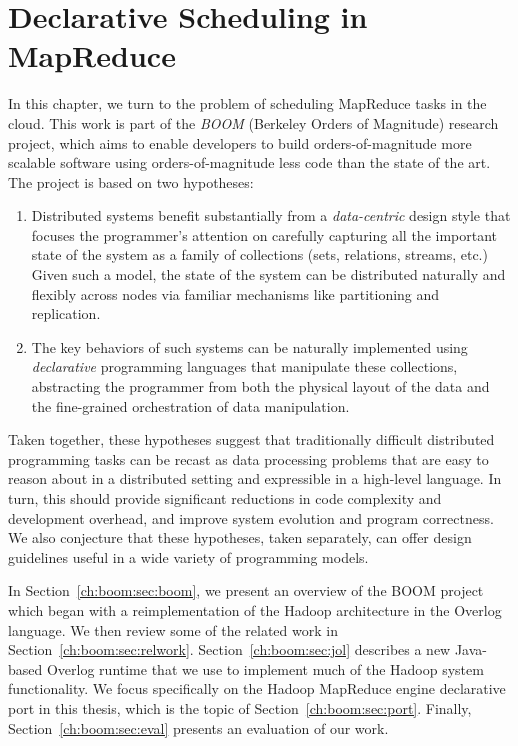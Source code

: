 \chapter[Declarative Scheduling in MapReduce]{Declarative Scheduling in MapReduce}
\label{ch:boom}

In this chapter, we turn to the problem of scheduling MapReduce tasks in the cloud. This work
is part of the \emph{BOOM} (Berkeley Orders of Magnitude) research
project, which aims to enable developers to build orders-of-magnitude more
scalable software using orders-of-magnitude less code than the state of the
art. The project is based on two hypotheses:
\begin{enumerate}
\item
  Distributed systems benefit substantially from a \emph{data-centric} design
  style that focuses the programmer's attention on carefully capturing all the
  important state of the system as a family of collections (sets, relations,
  streams, etc.)  Given such a model, the state of the system can be distributed
  naturally and flexibly across nodes via familiar mechanisms like partitioning
  and replication.
\item The key behaviors of such systems can be naturally implemented using
  \emph{declarative} programming languages that manipulate these collections,
abstracting the programmer from
  both the physical layout of the data and the fine-grained orchestration of
  data manipulation.
\end{enumerate}
Taken together, these hypotheses suggest that traditionally difficult
distributed programming tasks can be recast as data processing problems that are
easy to reason about in a distributed setting and expressible in a high-level
language.  In turn, this should provide significant reductions in code
complexity and development overhead, and improve system evolution and program
correctness.  We also conjecture that these hypotheses, taken separately, can
offer design guidelines useful in a wide variety of programming models.

In Section~\ref{ch:boom:sec:boom}, we present an overview of the BOOM project which
began with a reimplementation of the Hadoop architecture in the Overlog language. 
We then review some of the related work in Section~\ref{ch:boom:sec:relwork}.
Section~\ref{ch:boom:sec:jol} describes a new Java-based Overlog runtime that we use
to implement much of the Hadoop system functionality. We focus specifically on the
Hadoop MapReduce engine declarative port in this thesis, which is the topic of Section~\ref{ch:boom:sec:port}.
Finally, Section~\ref{ch:boom:sec:eval} presents an evaluation of our work.


